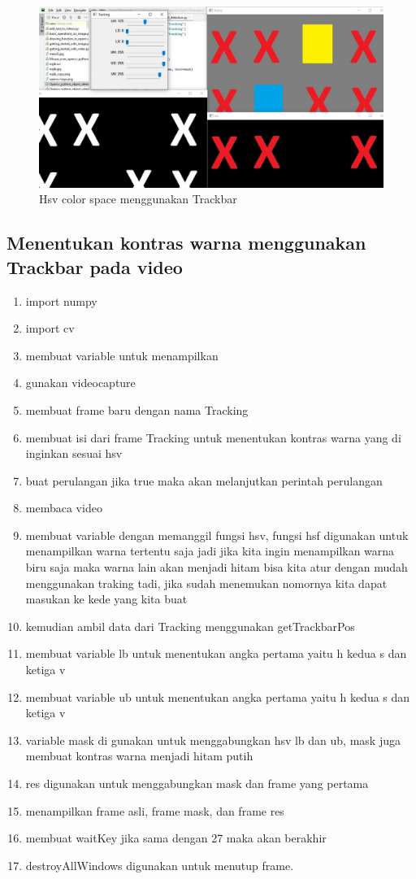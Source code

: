 \newpage
\begin{figure}[ht]
\centering
\includegraphics[scale=0.35]{figures/2,36,3.jpg}
\caption{Hsv color space menggunakan Trackbar}
\label{contoh}
\end{figure}



\newpage
\subsection{Menentukan kontras warna menggunakan Trackbar pada video}

\begin{enumerate}
	\item import numpy
	\item import cv
	\item membuat variable untuk menampilkan
	\item gunakan videocapture
	\item membuat frame baru dengan nama Tracking
	\item membuat isi dari frame Tracking untuk menentukan kontras warna yang di inginkan sesuai hsv
	\item buat perulangan jika true maka akan melanjutkan perintah perulangan
	\item membaca video
	\item membuat variable dengan memanggil fungsi hsv, fungsi hsf digunakan untuk menampilkan warna tertentu saja jadi jika kita ingin menampilkan warna biru saja maka warna lain akan menjadi hitam bisa kita atur dengan mudah menggunakan traking tadi, jika sudah menemukan nomornya kita dapat masukan ke kede yang kita buat
	\item kemudian ambil data dari Tracking menggunakan getTrackbarPos
	\item membuat variable lb untuk menentukan angka pertama yaitu h kedua s dan ketiga v
	\item membuat variable ub untuk menentukan angka pertama yaitu h kedua s dan ketiga v
	\item variable mask di gunakan untuk menggabungkan hsv lb dan ub, mask juga membuat kontras warna menjadi hitam putih
	\item res digunakan untuk menggabungkan mask dan frame yang pertama
	\item menampilkan frame asli, frame mask, dan frame res
	\item membuat waitKey jika sama dengan 27 maka akan berakhir
	\item destroyAllWindows digunakan untuk menutup frame.
\end{enumerate}

